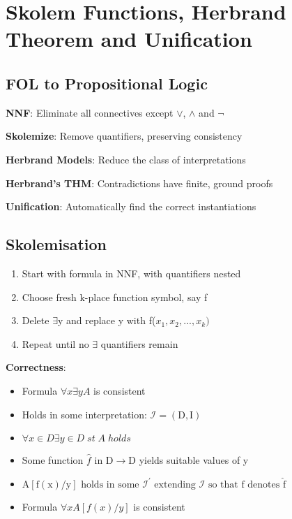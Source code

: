\documentclass{article}
\newenvironment{definition}{\par\color{blue}}{\par}
\begin{document}
\section{Skolem Functions, Herbrand Theorem and Unification}
\subsection{FOL to Propositional Logic}
\begin{definition}

\noindent
\textbf{NNF}: Eliminate all connectives except $\vee$, $\wedge$ and $\neg$

\noindent
\textbf{Skolemize}: Remove quantifiers, preserving consistency

\noindent
\textbf{Herbrand Models}: Reduce the class of interpretations

\noindent
\textbf{Herbrand's THM}: Contradictions have finite, ground proofs

\noindent
\textbf{Unification}: Automatically find the correct instantiations
\end{definition}

\subsection{Skolemisation}
\begin{enumerate}
    \item Start with formula in NNF, with quantifiers nested
    \item Choose fresh k-place function symbol, say f
    \item Delete $\exists$y and replace y with f($x_{1}, x_{2}, ..., x_{k})$
    \item Repeat until no $\exists$ quantifiers remain
\end{enumerate}

\noindent
\textbf{Correctness}:
\begin{itemize}
    \item Formula $\forall x \exists y A$ is consistent
    \item Holds in some interpretation: $\mathcal{I}=(\mathrm{D}, \mathrm{I})$
    \item $\forall x \in D \exists y \in D \; st \; A \; holds$
    
    \item Some function $\hat{f} \text { in } \mathrm{D} \rightarrow \mathrm{D}$ yields suitable values of y
    
    \item $\mathrm{A}[\mathrm{f}(\mathrm{x}) / \mathrm{y}] \text { holds in some } \mathcal{I}^{\prime} \text { extending } \mathcal{I} \text { so that } \mathrm{f} \text { denotes } \hat{\mathrm{f}}$
    
    \item Formula $\forall x A[f(x) / y]$ is consistent
\end{itemize}
\end{document}

